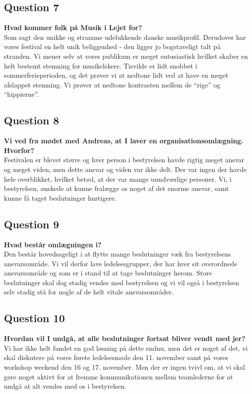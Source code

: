 \subsection{Question 7}
\label{i2q7}
\noindent \textbf{Hvad kommer folk på Musik i Lejet for?} \\
Som sagt den unikke og stramme udelukkende danske musikprofil. Derudover har vores festival en helt unik beliggenhed - den ligger jo bogstaveligt talt på stranden. Vi mener selv at vores publikum er meget entusiastisk hvilket skaber en helt bestemt stemning for musikelskere. Tisvilde er lidt snobbet i sommerferieperioden, og det prøver vi at nedtone lidt ved at have en meget afslappet stemning. Vi prøver at nedtone kontrasten mellem de “rige” og “hippierne”.

\subsection{Question 8}
\label{i2q8}
\noindent \textbf{Vi ved fra mødet med Andreas, at I laver en organisationsomlægning. Hvorfor?} \\
Festivalen er blevet større og hver person i bestyrelsen havde rigtig meget ansvar og meget viden, men dette ansvar og viden var ikke delt. Der var ingen der havde hele overblikket, hvilket betød, at der var mange uundværlige personer. Vi, i bestyrelsen, ønskede at kunne fralægge os noget af det enorme ansvar, samt kunne få taget beslutninger hurtigere. 

\subsection{Question 9}
\label{i2q9}
\noindent \textbf{Hvad består omlægningen i?} \\
Den består hovedsageligt i at flytte mange beslutninger væk fra bestyrelsens ansvarsområde. Vi vil derfor lave ledelsesgrupper, der har hver sit overordnede ansvarsområde og som er i stand til at tage beslutninger herom. Store beslutninger skal dog stadig vendes med bestyrelsen og vi vil også i bestyrelsen selv stadig stå for nogle af de helt vitale ansvarsområder. 

\subsection{Question 10}
\label{i2q10}
\noindent \textbf{Hvordan vil I undgå, at alle beslutninger fortsat bliver vendt med jer?} \\
Vi har ikke helt fundet en god løsning på dette endnu, men det er noget af det, vi skal diskutere på vores første ledelsesmøde den 11. november samt på vores workshop weekend den 16 og 17. november. Men der er ingen tvivl om, at vi skal gøre noget aktivt for at fremme kommunikationen mellem teamlederne for at undgå at alt vendes med os i bestyrelsen.

